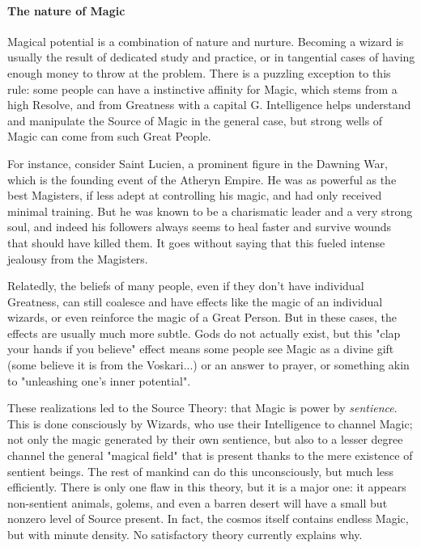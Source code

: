 \paragraph{The nature of Magic} 

Magical potential is a combination of nature and nurture. Becoming a wizard is usually the result of dedicated study and practice, or in tangential cases of having enough money to throw at the problem. There is a puzzling exception to this rule: some people can have a instinctive affinity for Magic, which stems from a high Resolve, and from Greatness with a capital G. Intelligence helps understand and manipulate the Source of Magic in the general case, but strong wells of Magic can come from such Great People.

For instance, consider Saint Lucien, a prominent figure in the Dawning War, which is the founding event of the Atheryn Empire. He was as powerful as the best Magisters, if less adept at controlling his magic, and had only received minimal training. But he was known to be a charismatic leader and a very strong soul, and indeed his followers always seems to heal faster and survive wounds that should have killed them. It goes without saying that this fueled intense jealousy from the Magisters.

Relatedly, the beliefs of many people, even if they don't have individual Greatness, can still coalesce and have effects like the magic of an individual wizards, or even reinforce the magic of a Great Person. But in these cases, the effects are usually much more subtle. Gods do not actually exist, but this "clap your hands if you believe" effect means some people see Magic as a divine gift (some believe it is from the Voskari...) or an answer to prayer, or something akin to "unleashing one's inner potential".
	
These realizations led to the Source Theory: that Magic is power by \textit{sentience}. This is done consciously by Wizards, who use their Intelligence to channel Magic; not only the magic generated by their own sentience, but also to a lesser degree channel the general "magical field" that is present thanks to the mere existence of sentient beings. The rest of mankind can do this unconsciously, but much less efficiently. There is only one flaw in this theory, but it is a major one: it appears non-sentient animals, golems, and even a barren desert will have a small but nonzero level of Source present. In fact, the cosmos itself contains endless Magic, but with minute density. No satisfactory theory currently explains why.

